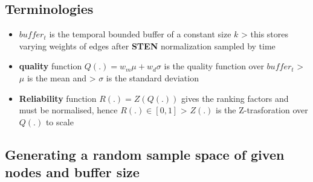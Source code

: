 \documentclass[11pt]{article}
\providecommand{\tightlist}{%
      \setlength{\itemsep}{0pt}\setlength{\parskip}{0pt}}
\begin{document}
    \subsection{Terminologies}\label{terminologies}

    \begin{itemize}
\tightlist
\item
  \(buffer_t\) is the temporal bounded buffer of a constant size \(k\)
  \textgreater{} this stores varying weights of edges after
  \textbf{STEN} normalization sampled by time 
\item
  \textbf{quality} function \(Q(.)=w_m\mu + w_d\sigma\) is the quality
  function over \(buffer_t\) \textgreater{} \(\mu\) is the mean and
  \textgreater{} \(\sigma\) is the standard deviation 
\item
  \textbf{Reliability} function \(R(.)=Z(Q(.))\) gives the ranking
  factors and must be normalised, hence \(R(.)\in[0,1]\) \textgreater{}
  \(Z(.)\) is the Z-trasforation over \(Q(.)\) to scale
\end{itemize}

    \subsection{Generating a random sample space of given nodes and buffer
size}\label{generating-a-random-sample-space-of-given-nodes-and-buffer-size}
\end{document}
